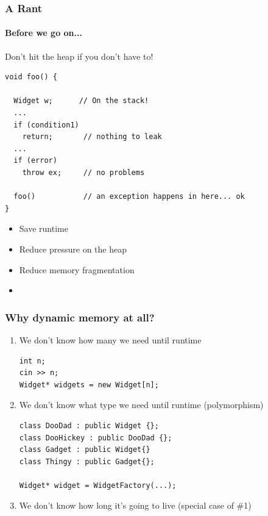 \begin{frame}[fragile,t]
\frametitle{A Rant}
\framesubtitle{Before we go on...}
Don't hit the heap if you don't have to!

{\scriptsize \begin{verbatim}
void foo() {

  Widget w;      // On the stack!
  ...
  if (condition1)
    return;       // nothing to leak
  ...
  if (error)
    throw ex;     // no problems

  foo()           // an exception happens in here... ok
}
\end{verbatim}}
\pause{}
\begin{itemize}
\item Save runtime
\item Reduce pressure on the heap
\item Reduce memory fragmentation
\pause{}
\item {}
\end{itemize}

\end{frame}


\begin{frame}[fragile,t]
\frametitle{Why dynamic memory at all?}
\vskip 6pt
\pause{}

\begin{enumerate}
\item We don't know how many we need until runtime
{\scriptsize \begin{verbatim}
int n;
cin >> n;
Widget* widgets = new Widget[n];
\end{verbatim}
}
\pause{}
\item We don't know what type we need until runtime (polymorphism)
{\scriptsize \begin{verbatim}
class DooDad : public Widget {};
class DooHickey : public DooDad {};
class Gadget : public Widget{}
class Thingy : public Gadget{};

Widget* widget = WidgetFactory(...);
\end{verbatim}
}
\pause{}
\item We don't know how long it's going to live (special case of \#1)
\end{enumerate}

\vskip 12pt
\pause{}

\end{frame}
